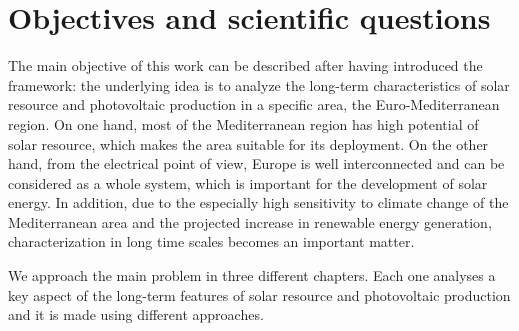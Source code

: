  

\section{Objectives and scientific questions}%


The main objective of this work can be described after having introduced the framework: the underlying idea is to analyze the long-term characteristics of solar resource and photovoltaic production in a specific area, the Euro-Mediterranean region. On one hand, most of the Mediterranean region has high potential of solar resource, which makes the area suitable for its deployment. On the other hand, from the electrical point of view, Europe is well interconnected and can be considered as a whole system, which is important for the development of solar energy. In addition, due to the especially high sensitivity to climate change of the Mediterranean area and the projected increase in renewable energy generation, characterization in long time scales becomes an important matter.

We approach the main problem in three different chapters. Each one analyses a key aspect of the long-term features of solar resource and photovoltaic production and it is made using different approaches.

